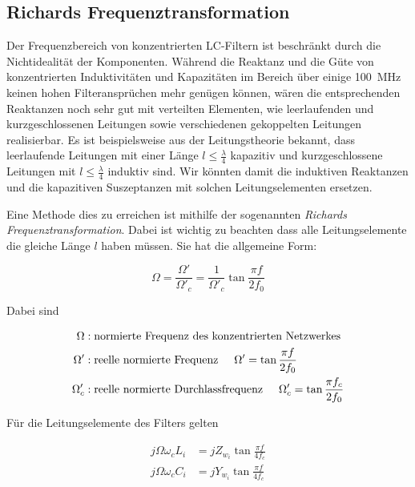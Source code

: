 \subsection{Richards Frequenztransformation}

Der  Frequenzbereich von konzentrierten LC-Filtern ist beschr\"ankt durch  die
Nichtidealit\"at der Komponenten.  W\"ahrend  die  Reaktanz und die G\"ute von
konzentrierten Induktivit\"aten und Kapazit\"aten  im  Bereich  \"uber  einige
\SI{100}{\mega\hertz} keinen hohen Filteranspr\"uchen mehr gen\"ugen k\"onnen,
w\"aren die entsprechenden Reaktanzen noch  sehr gut mit verteilten Elementen,
wie   leerlaufenden   und   kurzgeschlossenen  Leitungen  sowie  verschiedenen
gekoppelten   Leitungen  realisierbar.   Es   ist   beispielsweise   aus   der
Leitungstheorie  bekannt,  dass  leerlaufende  Leitungen   mit  einer  L\"ange
$l\le\frac{\lambda}{4}$   kapazitiv   und   kurzgeschlossene   Leitungen   mit
$l\le\frac{\lambda}{4}$  induktiv  sind.  Wir  k\"onnten damit die  induktiven
Reaktanzen und  die  kapazitiven  Suszeptanzen  mit  solchen Leitungselementen
ersetzen.

Eine Methode dies zu  erreichen  ist mithilfe der sogenannten \textit{Richards
Frequenztransformation}.   Dabei   ist   wichtig   zu   beachten   dass   alle
Leitungselemente  die  gleiche  L\"ange   $l$  haben  m\"ussen.  Sie  hat  die
allgemeine Form:

\begin{equation}
    \Omega = \frac{\Omega'}{\Omega'_c} = \frac{1}{\Omega'_c}\tan\frac{\pi f}{2f_0}
    \label{eq:richards}
\end{equation}

Dabei sind

\begin{align*}
    \Omega &: \textrm{normierte Frequenz des konzentrierten Netzwerkes} \\
    \Omega' &: \textrm{reelle normierte Frequenz}\hspace{5mm}\Omega' = \tan\frac{\pi f}{2f_0} \\
    \Omega'_c &: \textrm{reelle normierte Durchlassfrequenz}\hspace{5mm}\Omega'_c = \tan\frac{\pi f_c}{2f_0}
\end{align*}

F\"ur die Leitungselemente des Filters gelten

\begin{align}
    j\Omega\omega_cL_i &= jZ_{w_i}\tan\frac{\pi f}{4f_c} \\
    j\Omega\omega_cC_i &= jY_{w_i}\tan\frac{\pi f}{4f_c}
\end{align}

